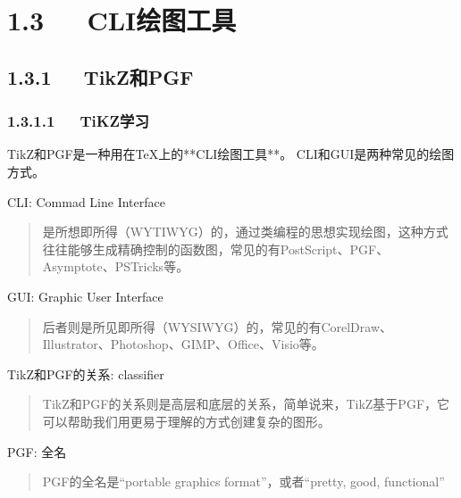 \documentclass[letterpaper,12pt,english]{sphinxmanual}
\begin{document}
\section{1.3   CLI绘图工具}
\label{\detokenize{001software/001install/LaTex:cli}}

\subsection{1.3.1   TikZ和PGF}
\label{\detokenize{001software/001install/LaTex:tikzpgf}}

\subsubsection{1.3.1.1   TiKZ学习}
\label{\detokenize{001software/001install/LaTex:tikz}}
TikZ和PGF是一种用在TeX上的**CLI绘图工具**。
CLI和GUI是两种常见的绘图方式。

CLI: Commad Line Interface
\begin{quote}

是所想即所得（WYTIWYG）的，通过类编程的思想实现绘图，这种方式往往能够生成精确控制的函数图，常见的有PostScript、PGF、Asymptote、PSTricks等。
\end{quote}

GUI: Graphic User Interface
\begin{quote}

后者则是所见即所得（WYSIWYG）的，常见的有CorelDraw、Illustrator、Photoshop、GIMP、Office、Visio等。
\end{quote}

TikZ和PGF的关系: classifier
\begin{quote}

TikZ和PGF的关系则是高层和底层的关系，简单说来，TikZ基于PGF，它可以帮助我们用更易于理解的方式创建复杂的图形。
\end{quote}

PGF: 全名
\begin{quote}

PGF的全名是“portable graphics format”，或者“pretty, good, functional”
\end{quote}
\end{document}
